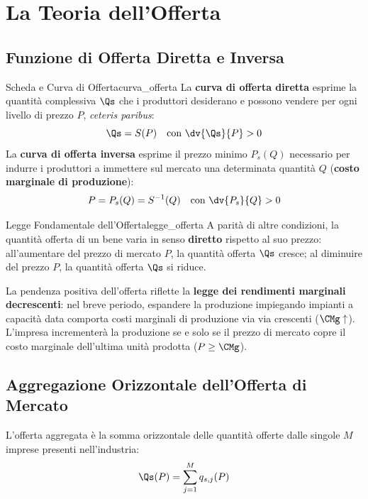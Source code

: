 \section{La Teoria dell'Offerta}

\subsection{Funzione di Offerta Diretta e Inversa}

\begin{definizione}{Scheda e Curva di Offerta}{curva_offerta}
La \textbf{curva di offerta diretta} esprime la quantità complessiva $\Qs$ che i produttori desiderano e possono vendere per ogni livello di prezzo $P$, \textit{ceteris paribus}:
\begin{equation}
    \Qs = S(P) \quad \text{con } \dv{\Qs}{P} > 0
\end{equation}
La \textbf{curva di offerta inversa} esprime il prezzo minimo $P_s(Q)$ necessario per indurre i produttori a immettere sul mercato una determinata quantità $Q$ (\textbf{costo marginale di produzione}):
\begin{equation}
    P = P_s(Q) = S^{-1}(Q) \quad \text{con } \dv{P_s}{Q} > 0
\end{equation}
\end{definizione}

\begin{legge}{Legge Fondamentale dell'Offerta}{legge_offerta}
A parità di altre condizioni, la quantità offerta di un bene varia in senso \textbf{diretto} rispetto al suo prezzo: all'aumentare del prezzo di mercato $P$, la quantità offerta $\Qs$ cresce; al diminuire del prezzo $P$, la quantità offerta $\Qs$ si riduce.
\end{legge}

La pendenza positiva dell'offerta riflette la \textbf{legge dei rendimenti marginali decrescenti}: nel breve periodo, espandere la produzione impiegando impianti a capacità data comporta costi marginali di produzione via via crescenti ($\CMg \uparrow$). L'impresa incrementerà la produzione se e solo se il prezzo di mercato copre il costo marginale dell'ultima unità prodotta ($P \ge \CMg$).

\subsection{Aggregazione Orizzontale dell'Offerta di Mercato}
L'offerta aggregata è la somma orizzontale delle quantità offerte dalle singole $M$ imprese presenti nell'industria:
\begin{equation}
    \Qs(P) = \sum_{j=1}^M q_{s,j}(P)
\end{equation}

